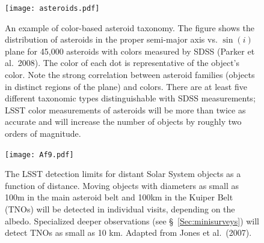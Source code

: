 \begin{figure}
\texttt{[image: asteroids.pdf]}
\caption{An example of color-based asteroid taxonomy. The figure
shows the distribution of asteroids in the proper semi-major axis vs. $\sin(i)$
plane for 45,000 asteroids with colors measured by SDSS (Parker et al.~2008). 
The color of each dot is representative of the object's color.
Note the strong correlation between asteroid families (objects in distinct regions
of the plane) and colors. There are
at least five different taxonomic types distinguishable with SDSS measurements;
LSST color measurements of asteroids will be more than twice as accurate
and will increase the number of objects by roughly two orders of magnitude.} 
\label{Fig:asteroids}
\end{figure}

\begin{figure}
\texttt{[image: Af9.pdf]}
\caption{The LSST detection limits for distant Solar System objects as
  a function of distance.
Moving objects with diameters as small as 100m in the main asteroid belt and 
100km in the Kuiper Belt (TNOs) will be detected in individual visits,
depending on the albedo. Specialized deeper observations  
(see \S~\ref{Sec:minisurveys}) will detect TNOs as small as 10 km. Adapted from 
Jones et al.~(2007).} 
\label{Fig:Af9}
\end{figure}



